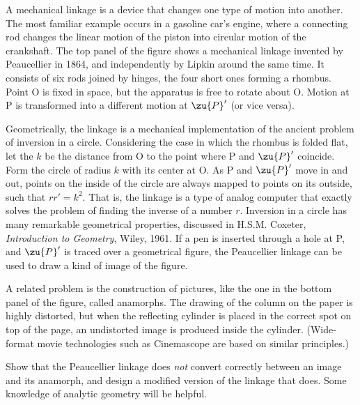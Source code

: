 A mechanical linkage is a device that changes one type of motion into
another. The most familiar example occurs in a gasoline
car's engine, where a connecting rod changes the linear motion of the
piston into circular motion of the crankshaft.
The top panel of the figure shows a mechanical linkage invented by Peaucellier in 1864, and
independently by Lipkin around the same time. It consists of six rods joined
by hinges, the four short ones forming a rhombus. Point O is fixed in space,
but the apparatus is free to rotate about O. Motion at P is transformed
into a different motion at $\zu{P}'$ (or vice versa).

Geometrically, the linkage is a mechanical implementation of
the ancient problem of inversion in a circle.
Considering the case in which the rhombus is folded flat, let
the $k$ be the distance from O to the point where P and  $\zu{P}'$
coincide. Form the circle of radius $k$ with its center at O.
As P and $\zu{P}'$ move in and out, points on the inside of the
circle are always mapped to points on its outside, such that
$rr'=k^2$. That is, the linkage is a type of analog computer
that exactly solves the problem of finding the inverse of a
number $r$. Inversion in a circle has many remarkable geometrical properties, discussed in
H.S.M. Coxeter, \emph{Introduction to Geometry}, Wiley, 1961.
If a pen is inserted through a hole at P, and $\zu{P}'$ is traced over
a geometrical figure, the Peaucellier linkage can be used to draw a kind
of image of the figure.

A related problem is the construction of pictures, like the one in the bottom
panel of the figure, called anamorphs.
The drawing of the column on the paper is highly distorted, but when the
reflecting cylinder is placed in the correct spot on top of the page,
an undistorted image is produced inside the cylinder. (Wide-format movie technologies
such as Cinemascope are based on similar principles.)

Show that the Peaucellier linkage does \emph{not} convert correctly between
an image and its anamorph, and design a modified version of the linkage that does.
Some knowledge of analytic geometry will be helpful.
